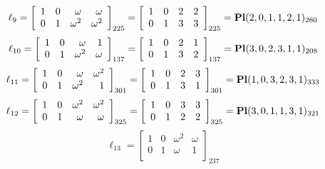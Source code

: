 \documentclass{article}
\begin{document}
{$$
\ell_{9} = 
\left[
\begin{array}{*{4}{r}}
1 & 0 & \omega  & \omega \\
0 & 1 & \omega^{2} & \omega^{2}\\
\end{array}
\right]
_{225}
=
\left[
\begin{array}{*{4}c}
1  & 0  & 2  & 2\\
0  & 1  & 3  & 3\\
\end{array}
\right]_{225}
={\rm\bf Pl}(2,0,1,1,2,1 )_{260}$$
$$
\ell_{10} = 
\left[
\begin{array}{*{4}{r}}
1 & 0 & \omega  & 1\\
0 & 1 & \omega^{2} & \omega \\
\end{array}
\right]
_{137}
=
\left[
\begin{array}{*{4}c}
1  & 0  & 2  & 1\\
0  & 1  & 3  & 2\\
\end{array}
\right]_{137}
={\rm\bf Pl}(3,0,2,3,1,1 )_{208}$$
$$
\ell_{11} = 
\left[
\begin{array}{*{4}{r}}
1 & 0 & \omega  & \omega^{2}\\
0 & 1 & \omega^{2} & 1\\
\end{array}
\right]
_{301}
=
\left[
\begin{array}{*{4}c}
1  & 0  & 2  & 3\\
0  & 1  & 3  & 1\\
\end{array}
\right]_{301}
={\rm\bf Pl}(1,0,3,2,3,1 )_{333}$$
$$
\ell_{12} = 
\left[
\begin{array}{*{4}{r}}
1 & 0 & \omega^{2} & \omega^{2}\\
0 & 1 & \omega  & \omega \\
\end{array}
\right]
_{325}
=
\left[
\begin{array}{*{4}c}
1  & 0  & 3  & 3\\
0  & 1  & 2  & 2\\
\end{array}
\right]_{325}
={\rm\bf Pl}(3,0,1,1,3,1 )_{321}$$
$$
\ell_{13} = 
\left[
\begin{array}{*{4}{r}}
1 & 0 & \omega^{2} & \omega \\
0 & 1 & \omega  & 1\\
\end{array}
\right]
_{237}
$$}
\end{document}
